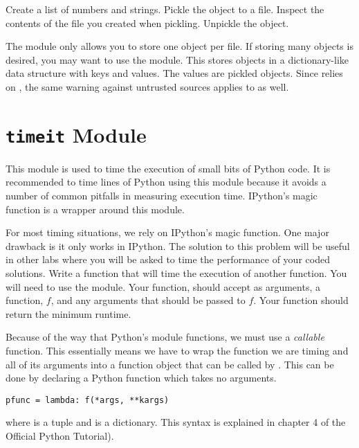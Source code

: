 \begin{problem}
Create a list of numbers and strings.  Pickle the object to a file.  Inspect the contents of the file you created when pickling.  Unpickle the object.
\end{problem}

The  module only allows you to store one object per file.
If storing many objects is desired, you may want to use the  module.
This stores objects in a dictionary-like data structure with keys and values.
The values are pickled objects.  Since  relies on , the
same warning against untrusted sources applies to  as well.

\section*{\texttt{timeit} Module}
This module is used to time the execution of small bits of Python code.
It is recommended to time lines of Python using this module because it avoids a number of common pitfalls in measuring execution time.  IPython's  magic function is a wrapper around this module.  

\begin{problem}
For most timing situations, we rely on IPython's  magic function.
One major drawback is it only works in IPython.
The solution to this problem will be useful in other labs where you will be
asked to time the performance of your coded solutions.
Write a function that will 
time the execution of another function.  You will need to use the  module.
Your function, should accept as arguments, a function, $f$, and any arguments that
should be passed to $f$.  Your function should return the minimum runtime.

Because of the way that Python's  module functions, we must use a \emph{callable}
function.  This essentially means we have to wrap the function we are timing and all of
its arguments into a function object that can be called by .
This can be done by declaring a Python  function which takes no arguments.
\begin{lstlisting}
pfunc = lambda: f(*args, **kargs)
\end{lstlisting}
where  is a tuple and  is a dictionary.  
This syntax is explained in chapter 4 of the Official Python Tutorial).
\end{problem}


